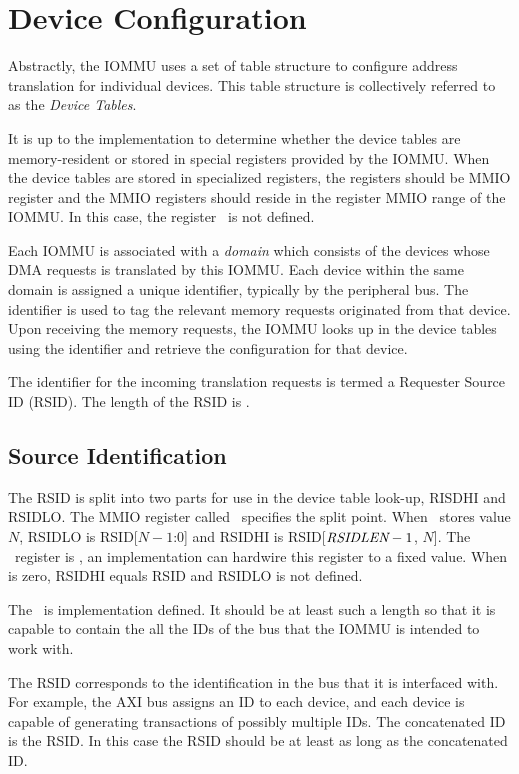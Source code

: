 \section{Device Configuration}

Abstractly, the IOMMU uses a set of table structure to configure address translation
for individual devices. This table structure is collectively referred to as the
\textit{Device Tables}.

It is up to the implementation to determine whether the device tables are memory-resident
or stored in special registers provided by the IOMMU. When the device tables are stored in
specialized registers, the registers should be MMIO register and the MMIO registers should
reside in the register MMIO range of the IOMMU. In this case, the register \dtbase\ is not
defined.

Each IOMMU is associated with a \textit{domain} which consists of the devices whose DMA
requests is translated by this IOMMU. Each device within the same domain is assigned a
unique identifier, typically by the peripheral bus. The identifier is used to tag the relevant
memory requests originated from that device. Upon receiving the memory requests, the IOMMU
looks up in the device tables using the identifier and retrieve the configuration for that
device.

The identifier for the incoming translation requests is termed a Requester Source ID
(RSID). The length of the RSID is \rsidlen.

\subsection{Source Identification}

The RSID is split into two parts for use in the device table look-up, RISDHI and
RSIDLO. The MMIO register called \rsiddiv\ specifies the split point. When \rsiddiv\ stores
value $N$, RSIDLO is RSID[$N-1$:$0$] and RSIDHI is RSID[$\textit{RSIDLEN} - 1$, $N$]. The
\rsiddiv\ register is \warl, an implementation can hardwire this register to a fixed
value. When \rsiddiv is zero, RSIDHI equals RSID and RSIDLO is not defined.

The \rsidlen\ is implementation defined. It should be at least such a length so that it is
capable to contain the all the IDs of the bus that the IOMMU is intended to work with.

\note The RSID corresponds to the identification in the bus that it is interfaced with.
For example, the AXI bus assigns an ID to each device, and each device is capable of
generating transactions of possibly multiple IDs. The concatenated ID is the RSID. In this
case the RSID should be at least as long as the concatenated ID.\noteend

